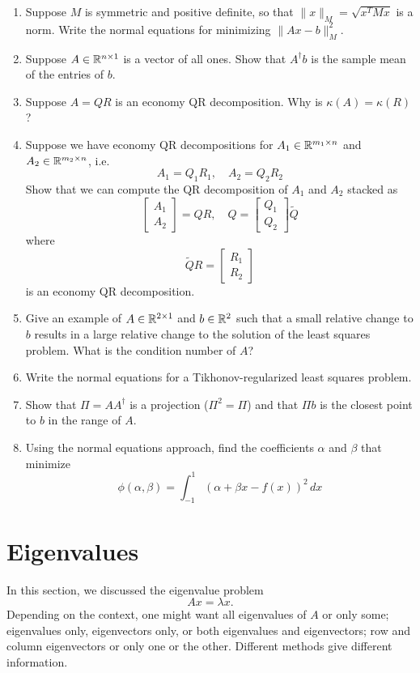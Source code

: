 \documentclass[12pt, leqno]{article}
\begin{document}
\begin{enumerate}
\item
  Suppose $M$ is symmetric and positive definite, so that
  $\|x\|_M = \sqrt{x^T M x}$ is a norm.  Write the normal
  equations for minimizing $\|Ax-b\|_M^2$.
\item
  Suppose $A \in \mathbb{R}^{n \times 1}$ is a vector of all ones.
  Show that $A^{\dagger} b$ is the sample mean of the entries
  of $b$.
\item
  Suppose $A = QR$ is an economy QR decomposition.
  Why is $\kappa(A) = \kappa(R)$?
\item
  Suppose we have economy QR decompositions for
  $A_1 \in \mathbb{R}^{m_1 \times n}$ and $A_2 \in \mathbb{R}^{m_2 \times n}$,
  i.e.
  \[
    A_1 = Q_1 R_1, \quad A_2 = Q_2 R_2
  \]
  Show that we can compute the QR decomposition of
  $A_1$ and $A_2$ stacked as
  \[
    \begin{bmatrix} A_1 \\ A_2 \end{bmatrix} = Q R, \quad
    Q = \begin{bmatrix} Q_1 \\ Q_2 \end{bmatrix} \tilde{Q}
  \]
  where
  \[
    \tilde{Q} R = \begin{bmatrix} R_1 \\ R_2 \end{bmatrix}
  \]
  is an economy QR decomposition.
\item
  Give an example of $A \in \mathbb{R}^{2 \times 1}$ and $b \in \mathbb{R}^2$
  such that a small relative change to $b$ results in a large
  relative change to the solution of the least squares problem.
  What is the condition number of $A$?
\item
  Write the normal equations for a Tikhonov-regularized least squares
  problem.
\item
  Show that $\Pi = A A^\dagger$ is a projection ($\Pi^2 = \Pi$) and
  that $\Pi b$ is the closest point to $b$ in the range of $A$.
\item
  Using the normal equations approach, find the coefficients
  $\alpha$ and $\beta$ that minimize
  \[
    \phi(\alpha, \beta) = \int_{-1}^1 (\alpha + \beta x - f(x))^2 \, dx
  \]
\end{enumerate}

\section{Eigenvalues}

In this section, we discussed the eigenvalue problem
\[
  A x = \lambda x.
\]
Depending on the context, one might want all eigenvalues of $A$ or
only some; eigenvalues only, eigenvectors only, or both eigenvalues
and eigenvectors; row and column eigenvectors or only one or the
other.  Different methods give different information.
\end{document}
